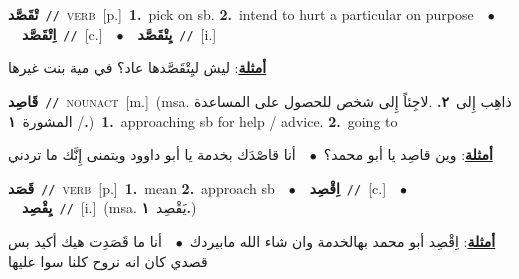 \documentclass[10pt,a4paper,twoside]{article} %
\begin{document}
\begin{multicols}{2}
{\setlength\topsep{0pt}\textbf{\foreignlanguage{arabic}{تْقَصَّد}}\ {\color{gray}\texttt{//}\color{black}}\ \textsc{verb}\ [p.]\ \textbf{1.}~pick on sb.  \textbf{2.}~intend to hurt a particular on purpose\ \ $\bullet$\ \ \setlength\topsep{0pt}\textbf{\foreignlanguage{arabic}{اِتْقَصَّد}}\ {\color{gray}\texttt{//}\color{black}}\ [c.]\ \ $\bullet$\ \ \setlength\topsep{0pt}\textbf{\foreignlanguage{arabic}{يِتْقَصَّد}}\ {\color{gray}\texttt{//}\color{black}}\ [i.]\  \begin{flushright}\color{gray}\foreignlanguage{arabic}{\textbf{\underline{\foreignlanguage{arabic}{أمثلة}}}: ليش ليِتْقَصَّدها عاد؟ في مية بنت غيرها}\end{flushright}\color{black}} \vspace{2mm}

{\setlength\topsep{0pt}\textbf{\foreignlanguage{arabic}{قَاصِد}}\ {\color{gray}\texttt{//}\color{black}}\ \textsc{noun\textunderscore act}\ [m.]\ \color{gray}(msa. \foreignlanguage{arabic}{ذاهِب إِلى}~\foreignlanguage{arabic}{\textbf{٢.}}  .\foreignlanguage{arabic}{لاجِئاً إِلى شخص للحصول على المساعدة / المشورة}~\foreignlanguage{arabic}{\textbf{١.}})\color{black}\ \textbf{1.}~approaching sb for help / advice.  \textbf{2.}~going to\  \begin{flushright}\color{gray}\foreignlanguage{arabic}{\textbf{\underline{\foreignlanguage{arabic}{أمثلة}}}: وين قاصِد يا أبو محمد؟\ $\bullet$\ \  أنا قاصْدَك بخدمة يا أبو داوود وبتمنى إِنَّك ما تردني}\end{flushright}\color{black}} \vspace{2mm}

{\setlength\topsep{0pt}\textbf{\foreignlanguage{arabic}{قَصَد}}\ {\color{gray}\texttt{//}\color{black}}\ \textsc{verb}\ [p.]\ \textbf{1.}~mean  \textbf{2.}~approach sb\ \ $\bullet$\ \ \setlength\topsep{0pt}\textbf{\foreignlanguage{arabic}{اِقْصِد}}\ {\color{gray}\texttt{//}\color{black}}\ [c.]\ \ $\bullet$\ \ \setlength\topsep{0pt}\textbf{\foreignlanguage{arabic}{يِقْصِد}}\ {\color{gray}\texttt{//}\color{black}}\ [i.]\ \color{gray}(msa. \foreignlanguage{arabic}{يَقْصِد}~\foreignlanguage{arabic}{\textbf{١.}})\color{black}\  \begin{flushright}\color{gray}\foreignlanguage{arabic}{\textbf{\underline{\foreignlanguage{arabic}{أمثلة}}}: اِقْصِد أبو محمد بهالخدمة وان شاء الله مابيردك\ $\bullet$\ \  أنا ما قَصَدِت هيك أكيد بس قصدي كان انه نروح كلنا سوا عليها}\end{flushright}\color{black}} \vspace{2mm}


\end{multicols}
\end{document}
